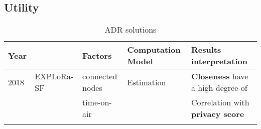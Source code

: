 \subsection{Utility}
\begin{longtable}{lllll}
	Year  & \                                              & \textbf{Factors}           & \textbf{Computation Model}             & \textbf{Results interpretation}                               \\\hline
	2018  & EXPLoRa-SF \cite{cuomo_explora_2017}           & connected nodes            & Estimation                             & \textbf{Closeness} have a high degree of                      \\
	\     &                                                & time-on-air                &                                        & Correlation with \textbf{privacy score}                       \\\hline

\caption{ADR solutions}
\end{longtable}





\clearpage
\newpage
\setlength{\hoffset}{-0in}
\twocolumn

